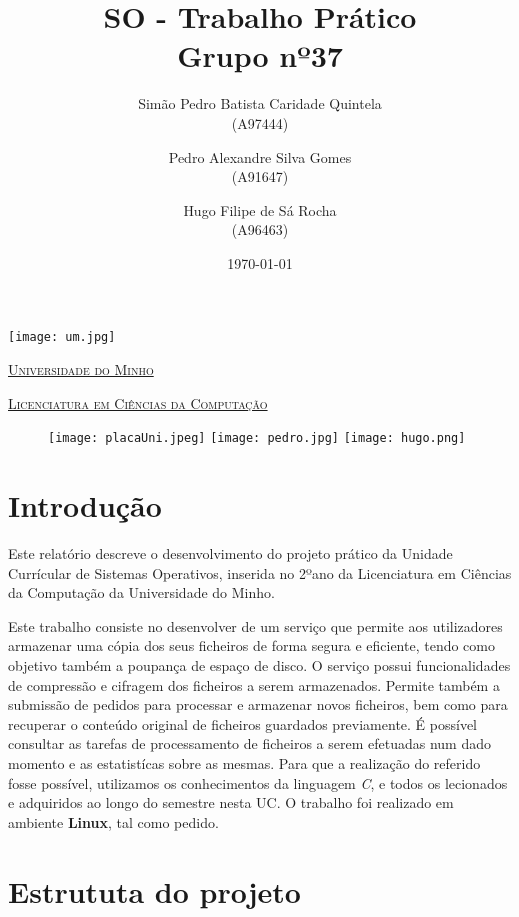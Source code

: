 \documentclass[11pt,a4paper]{report}
\title{SO - Trabalho Prático\\
	\large Grupo nº37}
\author{Simão Pedro Batista Caridade Quintela \\ (A97444) 
             \and Pedro Alexandre Silva Gomes \\ (A91647)
             \and Hugo Filipe de Sá Rocha \\ (A96463)
       } %
\date{\today} %
\begin{document}
	\begin{minipage}{0.9\linewidth}
        \centering
		\texttt{[image: um.jpg]}\par\vspace{1 cm}
		\href{https://www.uminho.pt/PT}
		{\scshape\LARGE Universidade do Minho} \par
		\vspace{0.6cm}
		\href{https://lcc.di.uminho.pt}
		{\scshape\Large Licenciatura em Ciências da Computação} \par
		\maketitle
		\begin{figure}[H]
			\texttt{[image: placaUni.jpeg]}
			\texttt{[image: pedro.jpg]}
    		\texttt{[image: hugo.png]}
		\end{figure}
	\end{minipage}
	
	\tableofcontents
	
	\pagebreak
	
	\chapter{Introdução}
%	
	Este relatório descreve o desenvolvimento do projeto prático da Unidade Currícular de Sistemas Operativos, inserida no 2ºano da Licenciatura em Ciências da Computação da Universidade do Minho.
	
	Este trabalho consiste no desenvolver de um serviço que permite aos utilizadores armazenar uma cópia dos seus ficheiros de forma segura e eficiente, tendo como objetivo também a poupança de espaço de disco. O serviço possui funcionalidades de compressão e cifragem dos ficheiros a serem armazenados. Permite também a submissão de pedidos para processar e armazenar novos ficheiros, bem como para recuperar o conteúdo original de ficheiros guardados previamente. É possível consultar as tarefas de processamento de ficheiros a serem efetuadas num dado momento e as estatistícas sobre as mesmas. Para que a realização do referido fosse possível, utilizamos os conhecimentos da linguagem \textit{C}, e todos os lecionados e adquiridos ao longo do semestre nesta UC. O trabalho foi realizado em ambiente \textbf{Linux}, tal como pedido.  
	
	\pagebreak
	
	\chapter{Estrututa do projeto}
	
\end{document}
